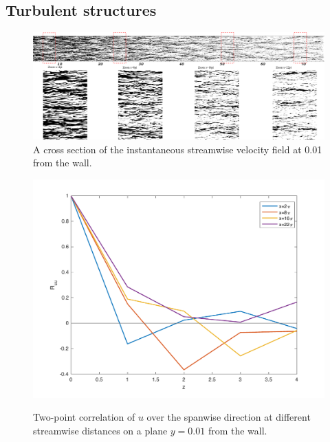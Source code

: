 \documentclass[twocolumn,10pt]{asme2e}
\begin{document}
\subsection*{Turbulent structures}

\begin{figure}[t]
	\includegraphics[width=\textwidth]{streaks.pdf}
	\caption{A cross section of the instantaneous streamwise velocity field at 0.01 from the wall.}
	\label{fig:streaks}
\end{figure}

\begin{figure}[t]
\centering
\scalebox{0.5}
{\includegraphics{spanwise_correlation.pdf}}
\caption{Two-point correlation of \(u\) over the spanwise direction at different streamwise distances on a plane \(y=0.01\) from the wall.}
\label{fig:spanwise_correlation}
\end{figure}
\end{document}
